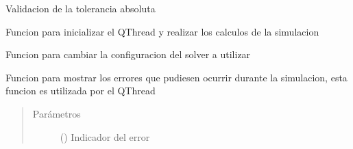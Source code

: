 \documentclass[letterpaper,10pt,spanish]{sphinxmanual}
\begin{document}

\begin{fulllineitems}
\label{\detokenize{codigos/simulacionHandler:simulacionHandler.atol_validator}}
Validacion de la tolerancia absoluta

\end{fulllineitems}


\begin{fulllineitems}
\label{\detokenize{codigos/simulacionHandler:simulacionHandler.calcular_simulacion}}
Funcion para inicializar el QThread y realizar los calculos de la simulacion

\end{fulllineitems}


\begin{fulllineitems}
\label{\detokenize{codigos/simulacionHandler:simulacionHandler.configuration_data}}
Funcion para cambiar la configuracion del solver a utilizar

\end{fulllineitems}


\begin{fulllineitems}
\label{\detokenize{codigos/simulacionHandler:simulacionHandler.error_gui}}
Funcion para mostrar los errores que pudiesen ocurrir durante la simulacion, esta funcion es utilizada por el QThread
\begin{quote}\begin{description}
\item[{Parámetros}] \leavevmode
{} () \textendash{} Indicador del error

\end{description}\end{quote}

\end{fulllineitems}
\end{document}
